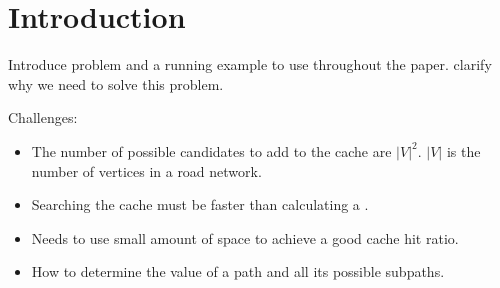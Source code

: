 \section{Introduction} \label{sec:intro}

Introduce problem and a running example to use throughout the paper. 
clarify why we need to solve this problem.

Challenges:
\begin{itemize}
\item The number of possible \spath candidates to add to the cache are $|V|^2$. $|V|$ is the number of vertices in a road network.
\item Searching the cache must be faster than calculating a \spathns.
\item Needs to use small amount of space to achieve a good cache hit ratio.
\item How to determine the value of a path and all its possible subpaths.
\end{itemize}





